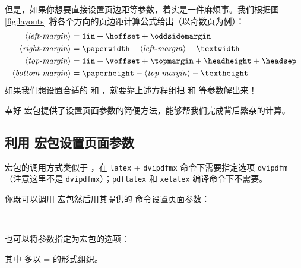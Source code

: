 但是，如果你想要直接设置页边距等参数，着实是一件麻烦事。我们根据图 \ref{fig:layouts} 将各个方向的页边距计算公式给出（以奇数页为例）：
\begin{align*}
\text{\Arg{left-margin}}   &= \text{\ttfamily 1in} 
                            + \text{\cmd{hoffset}}
                            + \text{\cmd{oddsidemargin}} \\
\text{\Arg{right-margin}}  &= \text{\cmd{paperwidth}} 
                            - \text{\Arg{left-margin}}
                            - \text{\cmd{textwidth}} \\
\text{\Arg{top-margin}}    &= \text{\ttfamily 1in} 
                            + \text{\cmd{voffset}}
                            + \text{\cmd{topmargin}}
                            + \text{\cmd{headheight}}
                            + \text{\cmd{headsep}} \\
\text{\Arg{bottom-margin}} &= \text{\cmd{paperheight}}
                            - \text{\Arg{top-margin}}
                            - \text{\cmd{textheight}}
\end{align*}
如果我们想设置合适的  和 ，就要靠上述方程组把  和  等参数解出来！

幸好  宏包提供了设置页面参数的简便方法，能够帮我们完成背后繁杂的计算。

\subsection{利用  宏包设置页面参数}\label{subsec:geometry}

 宏包的调用方式类似于 ，在 \texttt{latex} + \texttt{dvipdfmx} 命令下需要指定选项 \texttt{dvipdfm}
（注意这里不是 \texttt{dvipdfmx}）；\texttt{pdflatex} 和 \texttt{xelatex} 编译命令下不需要。

你既可以调用  宏包然后用其提供的  命令设置页面参数：
\begin{command}
 \\
\end{command}
也可以将参数指定为宏包的选项：
\begin{command}
\end{command}

其中  多以 = 的形式组织。

